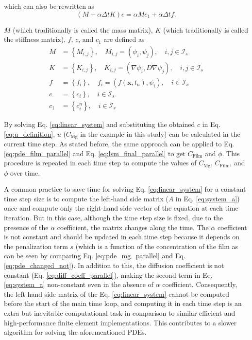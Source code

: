 \noindent which can also be rewritten as
\begin{equation} \label{eq:linear_eq_simple}
(M+\alpha \Delta t K) c=\alpha M c_{1}+\alpha \Delta t f.
\end{equation}

$M$ (which traditionally is called the mass matrix), $K$ (which traditionally is called the stiffness matrix), $f$, $c$, and $c_1$ are defined as
\begin{equation} \label{eq:matrices_defintion}
\begin{aligned} M &=\left\{M_{i, j}\right\}, \quad M_{i, j}=\left(\psi_{i}, \psi_{j}\right), \quad i, j \in \mathcal{I}_{s} \\ K &=\left\{K_{i, j}\right\}, \quad K_{i, j}=\left(\nabla \psi_{i}, D \nabla \psi_{j}\right), \quad i, j \in \mathcal{I}_{s} \\ f &=\left\{f_{i}\right\}, \quad f_{i}=\left(f\left(\boldsymbol{x}, t_{n}\right), \psi_{i}\right), \quad i \in \mathcal{I}_{s} \\ c &=\left\{c_{i}\right\}, \quad i \in \mathcal{I}_{s} \\ c_{1} &=\left\{c_{i}^{n}\right\}, \quad i \in \mathcal{I}_{s} \end{aligned}
\end{equation}

By solving Eq. \ref{eq:linear_system} and substituting the obtained $c$ in Eq. \ref{eq:u_definition}, $u$ ($C_{\mathrm{Mg}}$ in the example in this study) can be calculated in the current time step. As stated before, the same approach can be applied to Eq. \ref{eq:pde_film_parallel} and Eq. \ref{eq:lsm_final_parallel} to get $C_{\mathrm{Film}}$ and $\phi$. This procedure is repeated in each time step to compute the values of $C_{\mathrm{Mg}}$, $C_{\mathrm{Film}}$, and $\phi$ over time.

A common practice to save time for solving Eq. \ref{eq:linear_system}  for a constant time step size is to compute the left-hand side matrix ($A$ in Eq. \ref{eq:system_a}) once and compute only the right-hand side vector of the equation at each time iteration. But in this case, although the time step size is fixed, due to the presence of the $\alpha$ coefficient, the matrix changes along the time. The $\alpha$ coefficient is not constant and should be updated in each time step because it depends on the penalization term $s$ (which is a function of the concentration of the film as can be seen by comparing Eq. \ref{eq:pde_mg_parallel} and Eq. \ref{eq:pde_changed_not}). In addition to this, the diffusion coefficient is not constant (Eq. \ref{eq:diff_coeff_parallel}), making the second term in Eq. \ref{eq:system_a} non-constant even in the absence of $\alpha$ coefficient. Consequently, the left-hand side matrix of the Eq. \ref{eq:linear_system} cannot be computed before the start of the main time loop, and computing it in each time step is an extra but inevitable computational task in comparison to similar efficient and high-performance finite element implementations. This contributes to a slower algorithm for solving the aforementioned \gls{PDE}s.


